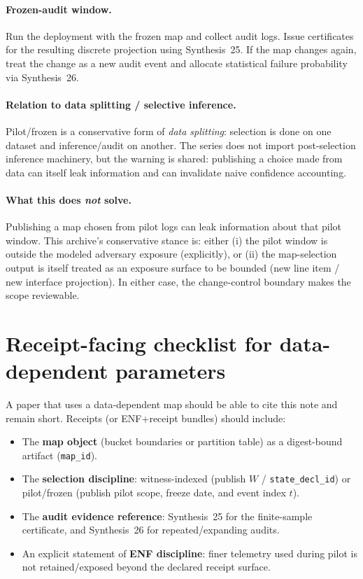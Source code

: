 \documentclass[11pt]{article}
\begin{document}
\paragraph{Frozen-audit window.}
Run the deployment with the frozen map and collect audit logs.
Issue certificates for the resulting discrete projection using Synthesis~25.
If the map changes again, treat the change as a new audit event and allocate statistical failure probability via Synthesis~26.\cite{series:anytimespend}

\paragraph{Relation to data splitting / selective inference.}
Pilot/frozen is a conservative form of \emph{data splitting}: selection is done on one dataset and inference/audit on another.
The series does not import post-selection inference machinery, but the warning is shared: publishing a choice made from data can itself leak information and can invalidate naive confidence accounting.\cite{leePostSelection2016}

\paragraph{What this does \emph{not} solve.}
Publishing a map chosen from pilot logs can leak information about that pilot window.
This archive's conservative stance is: either (i) the pilot window is outside the modeled adversary exposure (explicitly),
or (ii) the map-selection output is itself treated as an exposure surface to be bounded (new line item / new interface projection).
In either case, the change-control boundary makes the scope reviewable.

\section{Receipt-facing checklist for data-dependent parameters}
A paper that uses a data-dependent map should be able to cite this note and remain short.
Receipts (or ENF+receipt bundles) should include:
\begin{itemize}[leftmargin=*]
\item The \textbf{map object} (bucket boundaries or partition table) as a digest-bound artifact (\texttt{map\_id}).
\item The \textbf{selection discipline}: witness-indexed (publish $W$ / \texttt{state\_decl\_id}) or pilot/frozen (publish pilot scope, freeze date, and event index $t$).\cite{series:planstate}
\item The \textbf{audit evidence reference}: Synthesis~25 for the finite-sample certificate, and Synthesis~26 for repeated/expanding audits.\cite{series:stataudit,series:anytimespend}
\item An explicit statement of \textbf{ENF discipline}: finer telemetry used during pilot is not retained/exposed beyond the declared receipt surface.\cite{series:traceifaces}
\end{itemize}
\end{document}
